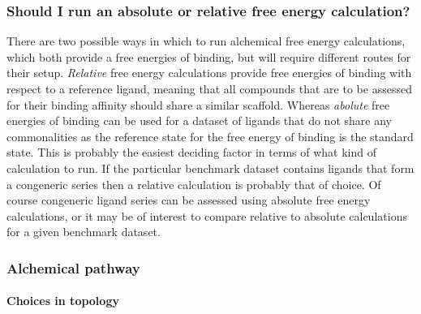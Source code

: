 \documentclass[9pt,bestpractices]{livecoms}
\begin{document}
\subsubsection{Should I run an absolute or relative free energy calculation?}
There are two possible ways in which to run alchemical free energy calculations, which both provide a free energies of binding, but will require different routes for their setup. \textit{Relative} free energy calculations provide free energies of binding with respect to a reference ligand, meaning that all compounds that are to be assessed for their binding affinity should share a similar scaffold. Whereas \textit{abolute} free energies of binding can be used for a dataset of ligands that do not share any commonalities as the reference state for the free energy of binding is the standard state. This is probably the easiest deciding factor in terms of what kind of calculation to run. If the particular benchmark dataset contains ligands that form a congeneric series then a relative calculation is probably that of choice. Of course congeneric ligand series can be assessed using absolute free energy calculations, or it may be of interest to compare relative to absolute calculations for a given benchmark dataset. 


\subsubsection{Alchemical pathway}

\paragraph{Choices in topology}
\end{document}
